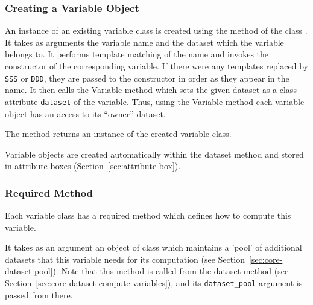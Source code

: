 {\subsubsection{Creating a Variable Object}
\variablesindex{}
%
An instance of an existing variable class is
created using the method
 \variablesindex{}of the
class .  It takes as arguments
the variable \variablesindex name and the dataset \datasetindex which the variable \variablesindex belongs to. It performs
template matching of the name and invokes the constructor of the corresponding
variable. \variablesindex If there were any templates replaced by \verb|SSS| or \verb|DDD|,
they are passed to the constructor in order as they appear in the name. It
then calls the Variable \variablesindex method  \datasetindex which sets the given
dataset \datasetindex as a class attribute \attributesindex \verb|dataset| \datasetindex of the variable. \variablesindex Thus, using the
Variable \variablesindex method  \datasetindex each variable \variablesindex object has an access to
its ``owner'' dataset. \datasetindex

The  method  \variablesindex returns an instance
of the created variable \variablesindex class.

Variable \variablesindex objects are created automatically within the dataset \datasetindex method
 \variablesindex and stored in attribute \attributesindex boxes
(Section~\ref{sec:attribute-box}).

\subsubsection{Required Method }
\variablesindex{}
%
Each variable \variablesindex class has a required method  which defines how
to compute this variable. \variablesindex

It takes as an argument an object of class  which
maintains a 'pool' of additional datasets that this variable \variablesindex needs for its computation 
(see Section~\ref{sec:core-dataset-pool}). Note that this method is called from the
dataset \datasetindex method  (see Section~\ref{sec:core-dataset-compute-variables}), 
and its \verb|dataset_pool| argument is passed from there. 

}
